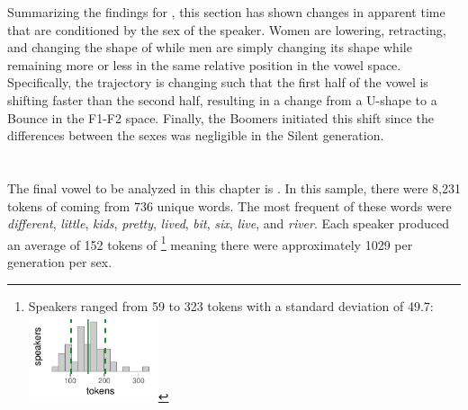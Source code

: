 Summarizing the findings for \bet, this section has shown changes in apparent time that are conditioned by the sex of the speaker. Women are lowering, retracting, and changing the shape of \bet while men are simply changing its shape while remaining more or less in the same relative position in the vowel space. Specifically, the trajectory is changing such that the first half of the vowel is shifting faster than the second half, resulting in a change from a U-shape to a Bounce in the F1-F2 space. Finally, the Boomers initiated this shift since the differences between the sexes was negligible in the Silent generation.




\section{\bit}
\label{BIT}


The final vowel to be analyzed in this chapter is \bit. In this sample, there were 8,231 tokens of \bit coming from 736 unique words. The most frequent of these words were \textit{different}, \textit{little}, \textit{kids}, \textit{pretty}, \textit{lived}, \textit{bit}, \textit{six}, \textit{live}, and \textit{river}. Each speaker produced an average of 152 tokens of \bit\footnote{Speakers ranged from 59 to 323 tokens with a standard deviation of 49.7: \includegraphics[width = 1.5in]{Figures/BIT/BIT_tiny.pdf}} meaning there were approximately 1029 per generation per sex.

